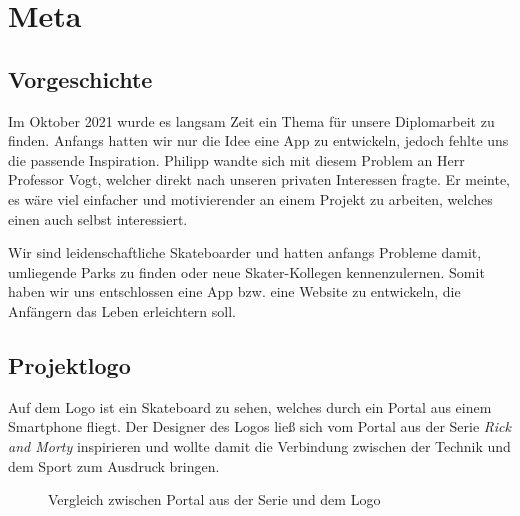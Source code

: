 \chapter{Meta}
\section{Vorgeschichte}
Im Oktober 2021 wurde es langsam Zeit ein Thema für unsere Diplomarbeit zu finden. Anfangs
hatten wir nur die Idee eine App zu entwickeln, jedoch fehlte uns die passende Inspiration. Philipp
wandte sich mit diesem Problem an Herr Professor Vogt, welcher direkt nach unseren privaten
Interessen fragte. Er meinte, es wäre viel einfacher und motivierender an einem Projekt zu arbeiten,
welches einen auch selbst interessiert.

Wir sind leidenschaftliche Skateboarder und hatten anfangs Probleme damit, umliegende Parks
zu finden oder neue Skater-Kollegen kennenzulernen. Somit haben wir uns entschlossen eine
App bzw. eine Website zu entwickeln, die Anfängern das Leben erleichtern soll.

\section{Projektlogo}
\label{logo}

Auf dem Logo ist ein Skateboard zu sehen, welches durch ein Portal aus einem Smartphone fliegt.
Der Designer des Logos ließ sich vom Portal aus der Serie \textit{Rick and Morty} inspirieren und wollte damit die Verbindung zwischen
der Technik und dem Sport zum Ausdruck bringen.

\begin{figure}[H]
    \centering
    \hfill
    \hfill
    \hfill
    \caption{Vergleich zwischen Portal aus der Serie und dem Logo}
\end{figure}